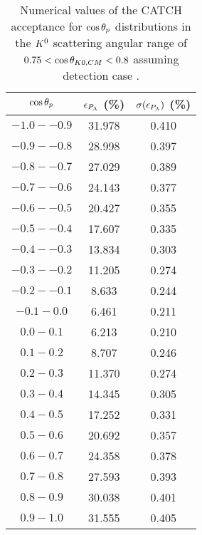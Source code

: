 \begin{table}[!h] 
  \begin{center}
  \caption{Numerical values of the CATCH acceptance for $\cos{\theta_p}$ distributions in the $K^{0}$ scattering angular range of \textbf{$0.75<\cos{\theta_{K0,CM}}<0.8$} assuming detection case .}
  \centering
  \begin{threeparttable}
    \begin{tabular}{ccc}
    $\cos{\theta_p}$ & $\epsilon_{P_{\Lambda}}$ (\%) & $\sigma(\epsilon_{P_{\Lambda}})$ (\%) \\
    \midrule\midrule
    $-1.0 - -0.9$ & 31.978 & 0.410 \\
    \midrule
    $-0.9 - -0.8$ & 28.998 & 0.397 \\
    \midrule
    $-0.8 - -0.7$ & 27.029 & 0.389 \\
    \midrule
    $-0.7 - -0.6$ & 24.143 & 0.377 \\
    \midrule
    $-0.6 - -0.5$ & 20.427 & 0.355 \\
    \midrule
    $-0.5 - -0.4$ & 17.607 & 0.335 \\
    \midrule
    $-0.4 - -0.3$ & 13.834 & 0.303 \\
    \midrule
    $-0.3 - -0.2$ & 11.205 & 0.274 \\
    \midrule
    $-0.2 - -0.1$ & 8.633 & 0.244 \\
    \midrule
    $-0.1 - 0.0$ & 6.461 & 0.211 \\
    \midrule
    $0.0 - 0.1$ & 6.213 & 0.210 \\
    \midrule
    $0.1 - 0.2$ & 8.707 & 0.246 \\
    \midrule
    $0.2 - 0.3$ & 11.370 & 0.274 \\
    \midrule
    $0.3 - 0.4$ & 14.345 & 0.305 \\
    \midrule
    $0.4 - 0.5$ & 17.252 & 0.331 \\
    \midrule
    $0.5 - 0.6$ & 20.692 & 0.357 \\
    \midrule
    $0.6 - 0.7$ & 24.358 & 0.378 \\
    \midrule
    $0.7 - 0.8$ & 27.593 & 0.393 \\
    \midrule
    $0.8 - 0.9$ & 30.038 & 0.401 \\
    \midrule
    $0.9 - 1.0$ & 31.555 & 0.405 \\
    \end{tabular}
  \end{threeparttable}
  \label{tab-Pl-acc_35}
  \end{center}
\end{table}

